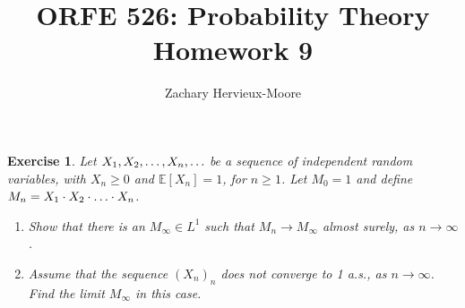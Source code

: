 \documentclass[12pt]{article}
\title{ORFE 526: Probability Theory \\ Homework 9}
\author{Zachary Hervieux-Moore}
\date{\displaydate{date}}
\theoremstyle{colon}
\newtheorem{exercise}{Exercise}
\begin{document}
\maketitle

\clearpage

\begin{exercise}
  Let $X_1, X_2, \mathellipsis, X_n, \mathellipsis$ be a sequence of independent random variables, with $X_n \geq 0$ and $\mathbb{E}[X_n] = 1$, for $n \geq 1$. Let $M_0 = 1$ and define $M_n = X_1 \cdot X_2 \cdot \mathellipsis \cdot X_n$.
  \begin{enumerate}[label=\alph*)]
    \item Show that there is an $M_\infty \in L^1$ such that $M_n \rightarrow M_\infty$ almost surely, as $n \rightarrow \infty$.
    \item Assume that the sequence $(X_n)_n$ does not converge to 1 a.s., as $n \rightarrow \infty$. Find the limit $M_\infty$ in this case.
  \end{enumerate}
\end{exercise}
\end{document}
